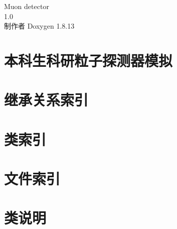 \documentclass[twoside]{book}
\newcommand{\+}{\discretionary{\mbox{\scriptsize$\hookleftarrow$}}{}{}}
\newcommand{\clearemptydoublepage}{%
  \newpage{\pagestyle{empty}\cleardoublepage}%
}
\begin{document}
\hypersetup{pageanchor=false,
             bookmarksnumbered=true,
             pdfencoding=unicode
            }
\begin{titlepage}
\vspace*{7cm}
\begin{center}%
{\Large Muon detector \\[1ex]\large 1.\+0 }\\
\vspace*{1cm}
{\large 制作者 Doxygen 1.8.13}\\
\end{center}
\end{titlepage}
\clearemptydoublepage
{}
\tableofcontents
\clearemptydoublepage
{}
\hypersetup{pageanchor=true}

\chapter{本科生科研粒子探测器模拟}
\label{index}\hypertarget{index}{}
\chapter{继承关系索引}

\chapter{类索引}

\chapter{文件索引}

\chapter{类说明}
















\end{document}
